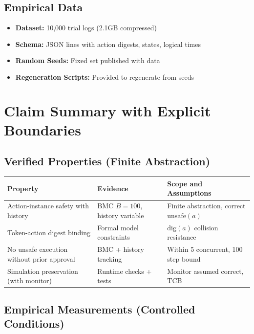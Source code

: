 \documentclass[12pt]{article}
\begin{document}
\subsection{Empirical Data}

\begin{itemize}
    \item \textbf{Dataset:} 10,000 trial logs (2.1GB compressed)
    \item \textbf{Schema:} JSON lines with action digests, states, logical times
    \item \textbf{Random Seeds:} Fixed set published with data
    \item \textbf{Regeneration Scripts:} Provided to regenerate from seeds
\end{itemize}

\section{Claim Summary with Explicit Boundaries}

\subsection{Verified Properties (Finite Abstraction)}

\begin{center}
\small
\begin{tabular}{@{}p{}p{}p{}@{}}
\toprule
\textbf{Property} & \textbf{Evidence} & \textbf{Scope and Assumptions} \\
\midrule
Action-instance safety with history & BMC $B=100$, history variable & Finite abstraction, correct $\text{unsafe}(a)$ \\
Token-action digest binding & Formal model constraints & $\mathrm{dig}(a)$ collision resistance \\
No unsafe execution without prior approval & BMC + history tracking & Within 5 concurrent, 100 step bound \\
Simulation preservation (with monitor) & Runtime checks + tests & Monitor assumed correct, TCB \\
\bottomrule
\end{tabular}
\end{center}

\subsection{Empirical Measurements (Controlled Conditions)}
\end{document}
